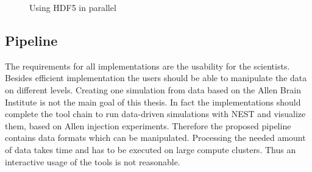 \documentclass[a4paper]{article}
\begin{document}
\begin{figure}[ht!]
   	\begin{center}
        \hspace{0.5cm}
  
    	   \end{center}
    	\caption{%
        Using HDF5 in parallel 
     }%
   \label{fig:atlas}
   \end{figure}


\subsection{Pipeline}
The requirements for all implementations are the usability for the scientists. Besides efficient implementation the users should be able to manipulate the data on different levels. Creating one simulation from data based on the Allen Brain Institute is not the main goal of this thesis. In fact the implementations should complete the tool chain to run data-driven simulations with NEST and visualize them, based on Allen injection experiments. Therefore the proposed pipeline contains data formats which can be manipulated. Processing the needed amount of data takes time and has to be executed on large compute clusters. Thus an interactive usage of the tools is not reasonable.
\end{document}
